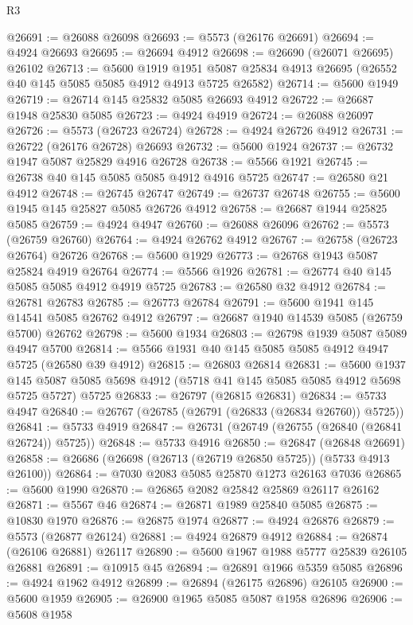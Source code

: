 \begin{lexlean}{R3}
\begin{coremodule}
@26691 := @26088 @26098
@26693 := @5573 (@26176 @26691)
@26694 := @4924 @26693
@26695 := @26694 @4912
@26698 := @26690 (@26071 @26695) @26102
@26713 := @5600
    @1919
    @1951
    @5087
    @25834
    @4913
    @26695
    (@26552 @40 @145 @5085 @5085 @4912 @4913 @5725 @26582)
@26714 := @5600 @1949
@26719 := @26714 @145 @25832 @5085 @26693 @4912
@26722 := @26687 @1948 @25830 @5085
@26723 := @4924 @4919
@26724 := @26088 @26097
@26726 := @5573 (@26723 @26724)
@26728 := @4924 @26726 @4912
@26731 := @26722 (@26176 @26728) @26693
@26732 := @5600 @1924
@26737 := @26732 @1947 @5087 @25829 @4916 @26728
@26738 := @5566 @1921
@26745 := @26738 @40 @145 @5085 @5085 @4912 @4916 @5725
@26747 := @26580 @21 @4912
@26748 := @26745 @26747
@26749 := @26737 @26748
@26755 := @5600 @1945 @145 @25827 @5085 @26726 @4912
@26758 := @26687 @1944 @25825 @5085
@26759 := @4924 @4947
@26760 := @26088 @26096
@26762 := @5573 (@26759 @26760)
@26764 := @4924 @26762 @4912
@26767 := @26758 (@26723 @26764) @26726
@26768 := @5600 @1929
@26773 := @26768 @1943 @5087 @25824 @4919 @26764
@26774 := @5566 @1926
@26781 := @26774 @40 @145 @5085 @5085 @4912 @4919 @5725
@26783 := @26580 @32 @4912
@26784 := @26781 @26783
@26785 := @26773 @26784
@26791 := @5600 @1941 @145 @14541 @5085 @26762 @4912
@26797 := @26687 @1940 @14539 @5085 (@26759 @5700) @26762
@26798 := @5600 @1934
@26803 := @26798 @1939 @5087 @5089 @4947 @5700
@26814 := @5566 @1931 @40 @145 @5085 @5085 @4912 @4947 @5725 (@26580 @39 @4912)
@26815 := @26803 @26814
@26831 := @5600
    @1937
    @145
    @5087
    @5085
    @5698
    @4912
    (@5718 @41 @145 @5085 @5085 @4912 @5698 @5725 @5727)
    @5725
@26833 := @26797 (@26815 @26831)
@26834 := @5733 @4947
@26840 := @26767 (@26785 (@26791 (@26833 (@26834 @26760)) @5725))
@26841 := @5733 @4919
@26847 := @26731 (@26749 (@26755 (@26840 (@26841 @26724)) @5725))
@26848 := @5733 @4916
@26850 := @26847 (@26848 @26691)
@26858 := @26686 (@26698 (@26713 (@26719 @26850 @5725)) (@5733 @4913 @26100))
@26864 := @7030 @2083 @5085 @25870 @1273 @26163 @7036
@26865 := @5600 @1990
@26870 := @26865 @2082 @25842 @25869 @26117 @26162
@26871 := @5567 @46
@26874 := @26871 @1989 @25840 @5085
@26875 := @10830 @1970
@26876 := @26875 @1974
@26877 := @4924 @26876
@26879 := @5573 (@26877 @26124)
@26881 := @4924 @26879 @4912
@26884 := @26874 (@26106 @26881) @26117
@26890 := @5600 @1967 @1988 @5777 @25839 @26105 @26881
@26891 := @10915 @45
@26894 := @26891 @1966 @5359 @5085
@26896 := @4924 @1962 @4912
@26899 := @26894 (@26175 @26896) @26105
@26900 := @5600 @1959
@26905 := @26900 @1965 @5085 @5087 @1958 @26896
@26906 := @5608 @1958

\end{coremodule}
\end{lexlean}
